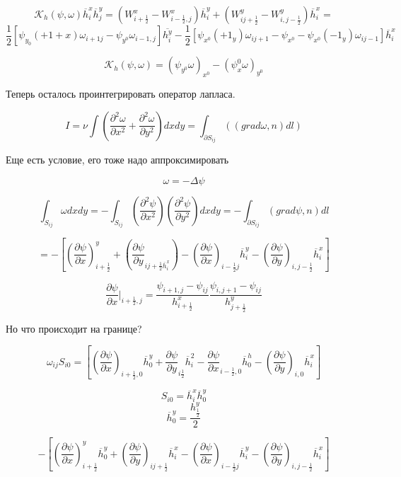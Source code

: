 \documentclass[12pt, a4paper]{article}
\begin{document}
\[ \mathcal{K}_h(\psi, \omega) \overline{h}^x_i \overline{h}^y_j = (W^x_{i+\frac{1}{2}} - W^x_{i-\frac{1}{2}, j}) \overline{h}^y_i + (W^y_{ij+\frac{1}{2}} - W^y_{i,j-\frac{1}{2}}) \overline{h}^x_i =  \]
\[ \frac{1}{2} [\psi_{y_0}(+1+x) \omega_{i+1j} - \psi_{y^0} \omega_{i-1,j}] \overline{h^y_i} - \frac{1}{2} [\psi_{x^0}(+1_y) \omega_{ij+1} - \psi_{x^0} - \psi_{x^0}(-1_y) \omega_{ij-1}] \overline{h}^x_i \]

\[ \mathcal{K}_h (\psi, \omega) = (\psi_{y^0} \omega)_{x^0} - (\psi_x^0 \omega)_{y^0} \]

Теперь осталось проинтегрировать оператор лапласа.

\[ I = \nu \int (\frac{\partial^2 \omega }{\partial x^2} + \frac{\partial^2 \omega}{\partial y^2}) dx dy = \int_{\partial S_{ij}}^{} ((grad \omega, n) dl) \]

Еще есть условие, его тоже надо аппроксимировать

\[ \omega = - \Delta \psi \]

\[ \int_{S_{ij}}^{} \omega dx dy = - \int_{S_{ij}}^{} (\frac{\partial^2 \psi}{\partial x^2}) (\frac{\partial^2 \psi}{\partial y^2}) dx dy  = - \int_{\partial S_{ij}}^{} (grad \psi, n) dl \]

\[ = -[{(\frac{\partial \psi}{\partial x})}_{i+\frac{1}{2}}^y + (\frac{\partial \psi}{\partial y}_{ij+\frac{1}{2} \overline{h}^x_i}) -(\frac{\partial \psi}{\partial x})_{i-\frac{1}{2}j} \overline{h}^y_i - (\frac{\partial \psi}{\partial y})_{i, j-\frac{1}{2}} \overline{h}^x_i]\]

\[ \frac{\partial \psi}{\partial x} |_{i+\frac{1}{2}, j} = \frac{\psi_{i+1,j} - \psi_{ij}}{h^x_{i+\frac{1}{2}}} \frac{\psi_{i, j+1} - \psi_{ij}}{h^y_{j+\frac{1}{2}}} \]

Но что происходит на границе?

\[ \omega_{ij} S_{i0} = [(\frac{\partial \psi}{\partial x})_{i+\frac{1}{2}, 0} \overline{h}^y_0 + \frac{\partial \psi}{\partial y}_{i\frac{1}{2}} \overline{h}^2_i - \frac{\partial \psi}{\partial x}_{i-\frac{1}{2},0} \overline{h}^h_0 - (\frac{\partial \psi}{\partial y})_{i,0} \overline{h}_i^x]\]

\[ S_{i0} = \overline{h}^x_i \overline{h}^y_0\]
\[ \overline{h}^y_0 = \frac{h^y_\frac{1}{2}}{2} \]

\[-[{(\frac{\partial \psi}{\partial x})}_{i+\frac{1}{2}}^y \overline{h}^y_0 + {(\frac{\partial \psi}{\partial y})}_{ij+\frac{1}{2}} \overline{h}^x_i -(\frac{\partial \psi}{\partial x})_{i-\frac{1}{2}j} \overline{h}^y_i - (\frac{\partial \psi}{\partial y})_{i, j-\frac{1}{2}} \overline{h}^x_i]\]
\end{document}
